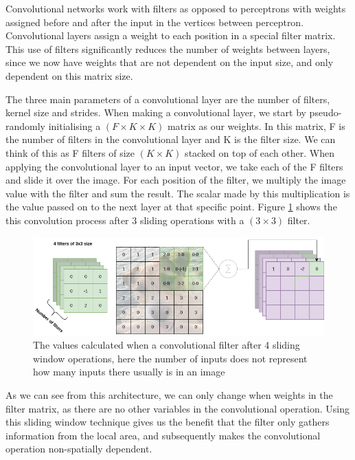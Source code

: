 Convolutional networks work with filters as opposed to perceptrons with weights assigned before and after the input in the vertices between perceptron. Convolutional layers assign a weight to each position in a special filter matrix. This use of filters significantly reduces the number of weights between layers, since we now have weights that are not dependent on the input size, and only dependent on this matrix size.

The three main parameters of a convolutional layer are the number of filters, kernel size and strides.
When making a convolutional layer, we start by pseudo-randomly initialising a $ (F \times K \times K)$ matrix as our weights.
In this matrix, F is the number of filters in the convolutional layer and K is the filter size. We can think of this as F filters of size $(K \times K)$ stacked on top of each other. 
When applying the convolutional layer to an input vector, we take each of the F filters and slide it over the image. 
For each position of the filter, we multiply the image value with the filter and sum the result. The scalar made by this multiplication is the value passed on to the next layer at that specific point.
Figure \ref{fig:conv_opp} shows the this convolution process after 3 sliding operations with a $(3 \times 3)$ filter.
 
\begin{figure}[t]
        \centering
        \includegraphics[scale=0.5]{background/figures/Conv_filter.png}
        \caption{The values calculated when a convolutional filter after 4 sliding window operations, here the number of inputs does not represent how many inputs there usually is in an image}
        \label{fig:conv_opp}
\end{figure}


As we can see from this architecture, we can only change when weights in the filter matrix, as there are no other variables in the convolutional operation. Using this sliding window technique gives us the benefit that the filter only gathers information from the local area, and subsequently makes the convolutional operation non-spatially dependent.  

